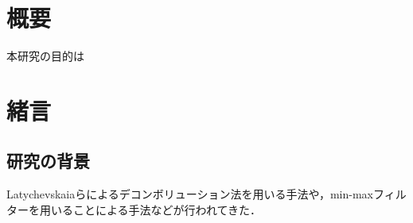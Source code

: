 \maketitle
\section*{概要}
本研究の目的は
\newpage
\tableofcontents
\newpage
\section{緒言}
\subsection{研究の背景}
Latychevskaiaらによるデコンボリューション法を用いる手法\cite{latychevskaia2010depth}や，min-maxフィルターを用いることによる手法\cite{tanakareduction}などが行われてきた．